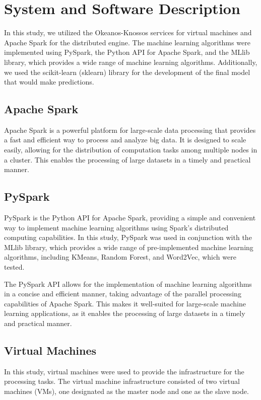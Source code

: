 \documentclass[conference]{IEEEtran}
\begin{document}
\section{System and Software Description}
In this study, we utilized the Okeanos-Knossos services for virtual machines and Apache Spark for the distributed engine. The machine learning algorithms were implemented using PySpark, the Python API for Apache Spark, and the MLlib library, which provides a wide range of machine learning algorithms. Additionally, we used the scikit-learn (sklearn) library for the development of the final model that would make predictions.

\subsection{Apache Spark}
Apache Spark \cite{spark} is a powerful platform for large-scale data processing that provides a fast and efficient way to process and analyze big data. It is designed to scale easily, allowing for the distribution of computation tasks among multiple nodes in a cluster. This enables the processing of large datasets in a timely and practical manner.

\subsection{PySpark}
PySpark \cite{pyspark} is the Python API for Apache Spark, providing a simple and convenient way to implement machine learning algorithms using Spark's distributed computing capabilities. In this study, PySpark was used in conjunction with the MLlib library, which provides a wide range of pre-implemented machine learning algorithms, including KMeans, Random Forest, and Word2Vec, which were tested.

The PySpark API allows for the implementation of machine learning algorithms in a concise and efficient manner, taking advantage of the parallel processing capabilities of Apache Spark. This makes it well-suited for large-scale machine learning applications, as it enables the processing of large datasets in a timely and practical manner.

\subsection{Virtual Machines}
In this study, virtual machines were used to provide the infrastructure for the processing tasks. The virtual machine infrastructure consisted of two virtual machines (VMs), one designated as the master node and one as the slave node.
\end{document}
